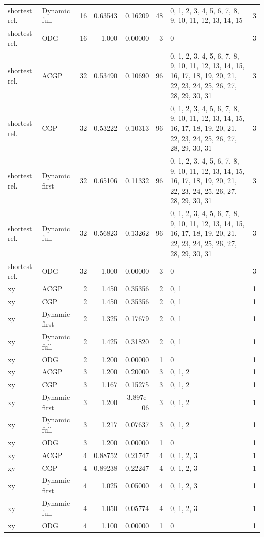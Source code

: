 \documentclass[10pt,a4paper]{article}
\begin{document}
\begin{longtable}{@{}p{23mm}p{29mm}rrrrp{36mm}r@{}}
shortest rel. & Dynamic full & 16 & 0.63543 & 0.16209 & 48 & 0, 1, 2, 3, 4, 5, 6, 7, 8, 9, 10, 11, 12, 13, 14, 15 & 3 \\
shortest rel. & ODG & 16 & 1.000 & 0.00000 & 3 & 0 & 3 \\
shortest rel. & ACGP & 32 & 0.53490 & 0.10690 & 96 & 0, 1, 2, 3, 4, 5, 6, 7, 8, 9, 10, 11, 12, 13, 14, 15, 16, 17, 18, 19, 20, 21, 22, 23, 24, 25, 26, 27, 28, 29, 30, 31 & 3 \\
shortest rel. & CGP & 32 & 0.53222 & 0.10313 & 96 & 0, 1, 2, 3, 4, 5, 6, 7, 8, 9, 10, 11, 12, 13, 14, 15, 16, 17, 18, 19, 20, 21, 22, 23, 24, 25, 26, 27, 28, 29, 30, 31 & 3 \\
shortest rel. & Dynamic first & 32 & 0.65106 & 0.11332 & 96 & 0, 1, 2, 3, 4, 5, 6, 7, 8, 9, 10, 11, 12, 13, 14, 15, 16, 17, 18, 19, 20, 21, 22, 23, 24, 25, 26, 27, 28, 29, 30, 31 & 3 \\
shortest rel. & Dynamic full & 32 & 0.56823 & 0.13262 & 96 & 0, 1, 2, 3, 4, 5, 6, 7, 8, 9, 10, 11, 12, 13, 14, 15, 16, 17, 18, 19, 20, 21, 22, 23, 24, 25, 26, 27, 28, 29, 30, 31 & 3 \\
shortest rel. & ODG & 32 & 1.000 & 0.00000 & 3 & 0 & 3 \\
xy & ACGP & 2 & 1.450 & 0.35356 & 2 & 0, 1 & 1 \\
xy & CGP & 2 & 1.450 & 0.35356 & 2 & 0, 1 & 1 \\
xy & Dynamic first & 2 & 1.325 & 0.17679 & 2 & 0, 1 & 1 \\
xy & Dynamic full & 2 & 1.425 & 0.31820 & 2 & 0, 1 & 1 \\
xy & ODG & 2 & 1.200 & 0.00000 & 1 & 0 & 1 \\
xy & ACGP & 3 & 1.200 & 0.20000 & 3 & 0, 1, 2 & 1 \\
xy & CGP & 3 & 1.167 & 0.15275 & 3 & 0, 1, 2 & 1 \\
xy & Dynamic first & 3 & 1.200 & 3.897e-06 & 3 & 0, 1, 2 & 1 \\
xy & Dynamic full & 3 & 1.217 & 0.07637 & 3 & 0, 1, 2 & 1 \\
xy & ODG & 3 & 1.200 & 0.00000 & 1 & 0 & 1 \\
xy & ACGP & 4 & 0.88752 & 0.21747 & 4 & 0, 1, 2, 3 & 1 \\
xy & CGP & 4 & 0.89238 & 0.22247 & 4 & 0, 1, 2, 3 & 1 \\
xy & Dynamic first & 4 & 1.025 & 0.05000 & 4 & 0, 1, 2, 3 & 1 \\
xy & Dynamic full & 4 & 1.050 & 0.05774 & 4 & 0, 1, 2, 3 & 1 \\
xy & ODG & 4 & 1.100 & 0.00000 & 1 & 0 & 1 \\

\end{longtable}
\end{document}
